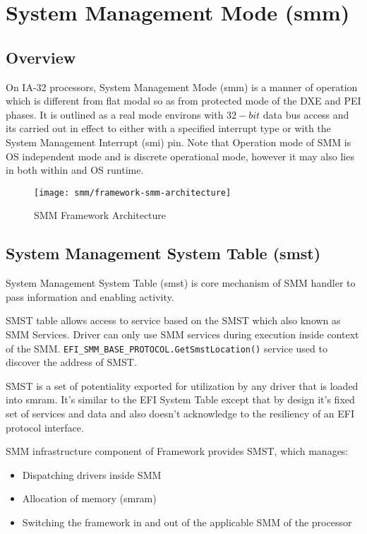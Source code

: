 \section{System Management Mode (\gls{smm})}\label{section-smm}
\subsection{Overview}
On IA-32 processors, System Management Mode (\gls{smm}) is a manner of operation which is different from flat modal so as from protected mode of the DXE and PEI phases. It is outlined as a real mode environs with $ 32-bit $ data bus access and its carried out in effect to either with a specified interrupt type or with the System Management Interrupt (\gls{smi}) pin. Note that Operation mode of SMM is OS independent mode and is discrete operational mode, however it may also lies in both within and OS runtime.

\begin{figure}[!htbp]
	\centering
	\texttt{[image: smm/framework-smm-architecture]}
	\caption{SMM Framework Architecture}\label{fig:framework-smm-architecture}
\end{figure}


\subsection{System Management System Table (\gls{smst})}
System Management System Table (\gls{smst}) is core mechanism of SMM handler to pass information and enabling activity.

SMST table allows access to service based on the SMST which also known as SMM Services. Driver can only use SMM services during execution inside context of the SMM. \verb|EFI_SMM_BASE_PROTOCOL.GetSmstLocation()| service used to discover the address of SMST.

SMST is a set of potentiality exported for utilization by any driver that is loaded into \gls{smram}. It's similar to the EFI System Table except that by design it's fixed set of services and data and also doesn't acknowledge to the resiliency of an EFI protocol interface.

SMM infrastructure component of Framework provides SMST, which manages:
\begin{itemize}
	\item Dispatching drivers inside SMM
	\item Allocation of memory (\gls{smram})
	\item Switching the framework in and out of the applicable SMM of the processor
\end{itemize}

